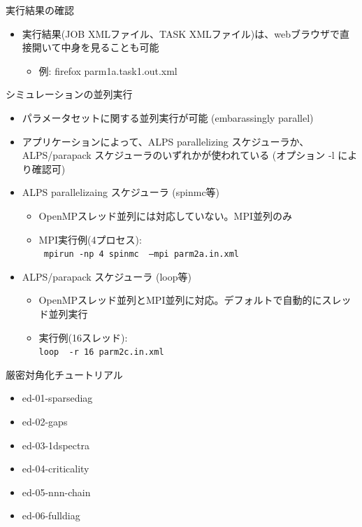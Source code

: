 \begin{frame}{実行結果の確認}
  \begin{itemize}
    \item 実行結果(JOB XMLファイル、TASK XMLファイル)は、webブラウザで直接開いて中身を見ることも可能
      \begin{itemize}
      \item 例: firefox parm1a.task1.out.xml
      \end{itemize}
  \end{itemize}
\end{frame}

\begin{frame}{シミュレーションの並列実行}
  \begin{itemize}
    \item パラメータセットに関する並列実行が可能 (embarassingly parallel)
    \item アプリケーションによって、ALPS parallelizing スケジューラか、ALPS/parapack スケジューラのいずれかが使われている (オプション -l により確認可)
    \item ALPS parallelizaing スケジューラ (spinmc等)
      \begin{itemize}
        \item OpenMPスレッド並列には対応していない。MPI並列のみ
        \item MPI実行例(4プロセス): \\ {\tt {\color{red} mpirun -np 4} spinmc {\color{red} --mpi} parm2a.in.xml}
      \end{itemize}
    \item ALPS/parapack スケジューラ (loop等)
      \begin{itemize}
        \item OpenMPスレッド並列とMPI並列に対応。デフォルトで自動的にスレッド並列実行
        \item 実行例(16スレッド): \\ {\tt loop {\color{red} -r 16} parm2c.in.xml}
      \end{itemize}
  \end{itemize}
\end{frame}

\begin{frame}{厳密対角化チュートリアル}
  \begin{itemize}
  \item ed-01-sparsediag
  \item ed-02-gaps
  \item ed-03-1dspectra
  \item ed-04-criticality
  \item ed-05-nnn-chain
  \item ed-06-fulldiag
  \end{itemize}
\end{frame}

